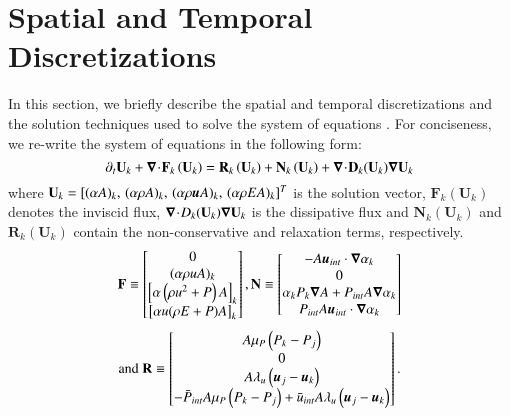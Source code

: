\documentclass[preprint,10pt]{elsarticle}
\begin{document}
\section{Spatial and Temporal Discretizations} \label{sec:disc}
In this section, we briefly describe the spatial and temporal discretizations and the solution techniques 
used to solve the system of equations . For conciseness, we re-write the system of 
equations in the following form:
\begin{equation}
\label{eq:form}
\partial_t \mathbf{U}_k + \boldsymbol\nabla\! \cdot \! \mathbf{F}_k \left( \mathbf{U}_k \right) = \mathbf{R}_k \left( \mathbf{U}_k \right) + \mathbf{N}_k \left( \mathbf{U}_k \right) + \boldsymbol\nabla\! \cdot \! \mathbf{D}_k(\mathbf{U}_k) \boldsymbol\nabla \mathbf{U}_k
\end{equation}
where $\mathbf{U}_k=[(\alpha A )_k, \, (\alpha \rho A)_k,\, (\alpha \rho \boldsymbol u A)_k,\, (\alpha \rho E A)_k]^T$ is the solution vector, $\mathbf{F}_k \left( \mathbf{U}_k \right)$ denotes the inviscid flux, $\boldsymbol\nabla\! \cdot \! D_k (\mathbf{U}_k) \boldsymbol\nabla \mathbf{U}_k$ is the dissipative flux and $\mathbf{N}_k \left( \mathbf{U}_k \right)$ and $\mathbf{R}_k \left( \mathbf{U}_k \right)$ contain the non-conservative and relaxation terms, respectively. 
\begin{equation}
  \mathbf{F} \equiv
  \begin{bmatrix}
      0     \\
    ( \alpha \rho u A )_k     \\
    \left[ \alpha \left(\rho u^2 + P \right) A \right ]_k  \\
    \left[ \alpha u (\rho E + P) A \right]_k
  \end{bmatrix},
  \mathbf{N} \equiv
  \begin{bmatrix}
      - A \boldsymbol u_{int} \cdot \boldsymbol\nabla \alpha_k     \\
    0     \\
    \alpha_k P_k \boldsymbol\nabla A + P_{int} A \boldsymbol\nabla \alpha_k  \\
    P_{int} A \boldsymbol u_{int} \cdot \boldsymbol\nabla \alpha_k
  \end{bmatrix} \nonumber
\end{equation}
\begin{equation}
\text{and }
  \mathbf{R} \equiv
  \begin{bmatrix}
      A \mu_P \left( P_k - P_j \right)     \\
    0     \\
    A \lambda_u \left( \boldsymbol u_j - \boldsymbol u_k \right) \\
    - \bar{P}_{int} A \mu_P \left( P_k - P_j \right) + \bar{u}_{int} A \lambda_u \left( \boldsymbol u_j - \boldsymbol u_k \right)
  \end{bmatrix}. \nonumber
\end{equation}
\end{document}

